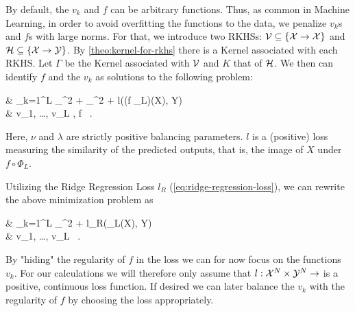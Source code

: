 By default, the $v_k$ and $f$ can be arbitrary functions.
Thus, as common in Machine Learning, in order to avoid overfitting the functions to the data, we penalize $v_k$s and $f$s with large norms.
For that, we introduce two RKHSs:
$\mathcal{V} \subseteq \{\mathcal{X} \rightarrow \mathcal{X}\}$ and $\mathcal{H} \subseteq \{\mathcal{X} \rightarrow \mathcal{Y}\}$. 
By \cref{theo:kernel-for-rkhs} there is a Kernel associated with each RKHS.
Let $\Gamma$ be the Kernel associated with $\mathcal{V}$ and $K$ that of $\mathcal{H}$.
We then can identify $f$ and the $v_k$ as solutions to the following problem:
\begin{problem}
	\label{prob:min-v-f}
	\begin{cases}
		 & \nu \cdot {} \sum_{k=1}^{L} _\cV^2
		+ \lambda {}_\cH^2 
		+ l((f \circ \Phi_L)(X), Y) \\
		 & v_1, \ldots, v_L \in \cV, f \in \cH \ .
	\end{cases}
\end{problem}
Here, $\nu$ and $\lambda$ are strictly positive balancing parameters.
$l$ is a (positive) loss measuring the similarity of the predicted outputs, that is, the image of $X$ under $f \circ \Phi_L$.

Utilizing the Ridge Regression Loss $l_R$ (\cref{eq:ridge-regression-loss}), we can rewrite the above minimization problem as
\begin{problem}
	\begin{cases}
		 & \nu \cdot {} \sum_{k=1}^{L} _\cV^2
		+ l_R(\Phi_L(X), Y) \\
		 & v_1, \ldots, v_L \in \cV\ .
	\end{cases}
\end{problem}
By "hiding" the regularity of $f$ in the loss we can for now focus on the functions $v_k$.
For our calculations we will therefore only assume that $l: \mathcal{X}^N \times \mathcal{Y}^N \rightarrow$ is a positive, continuous loss function.
If desired we can later balance the $v_k$ with the regularity of $f$ by choosing the loss appropriately.

